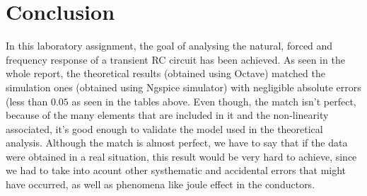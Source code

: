 \section{Conclusion}
\label{sec:conclusion}

\par In this laboratory assignment, the goal of analysing the natural, forced and frequency response of a transient RC circuit has been achieved. As seen in the whole report, the theoretical results (obtained using Octave) matched the simulation ones (obtained using Ngspice simulator) with negligible absolute errors (less than $0.05$ as seen in the tables above. Even though, the match isn't perfect, because of the many elements that are included in it and the non-linearity associated, it's good enough to validate the model used in the theoretical analysis. Although the match is almost perfect, we have to say that if the data were obtained in a real situation, this result would be very hard to achieve, since we had to take into acount other systhematic and accidental errors that might have occurred, as well as phenomena like joule effect in the conductors.



